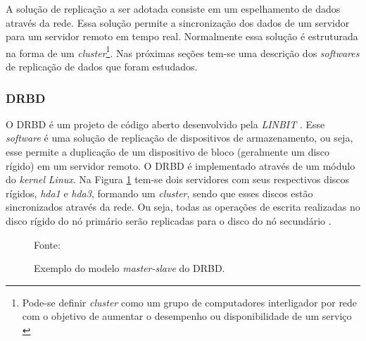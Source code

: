 A solução de replicação a ser adotada consiste em um espelhamento de dados através da rede. Essa solução permite a sincronização dos dados de um 
servidor para um servidor remoto em tempo real. Normalmente essa solução é estruturada na forma de um \textit{cluster}\footnote[2]{Pode-se definir 
\textit{cluster} como um grupo de computadores interligador por rede com o objetivo de aumentar o desempenho ou disponibilidade de um serviço 
\cite{freitas2005}}.
Nas próximas seções tem-se uma descrição dos \textit{softwares} de replicação de dados que foram estudados.


\subsubsection{DRBD}
\label{section:drbd}
O \ac{DRBD} é um projeto de código aberto desenvolvido pela \textit{LINBIT} \cite{drbd}.
Esse \textit{software} é uma solução de replicação de dispositivos de armazenamento, ou seja, esse permite a duplicação de um dispositivo de bloco 
(geralmente um disco rígido) em um servidor remoto. O \ac{DRBD} é implementado através de um módulo do \textit{kernel} \textit{Linux}. 
Na Figura \ref{fig:drbd_basic} tem-se dois servidores com seus respectivos discos rígidos, \textit{hda1} e 
\textit{hda3}, formando um \textit{cluster}, sendo que esses discos estão sincronizados através da rede. Ou seja, todas as operações de escrita 
realizadas no disco rígido do nó primário serão replicadas para o disco do nó secundário \cite{zaminhani2008}.

\begin{figure}[h!]
 \centering
 \caption{Exemplo do modelo \textit{master-slave} do \ac{DRBD}.}
 Fonte: \citet{jones2010}
 \label{fig:drbd_basic}
\end{figure}

